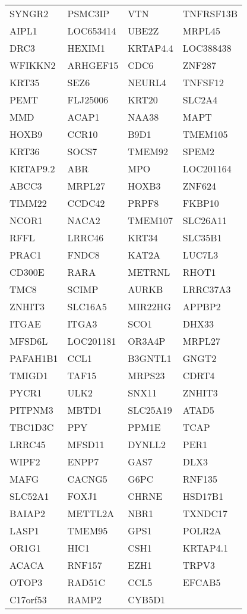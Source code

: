 {\begin{longtable}{llll}
SYNGR2&PSMC3IP&VTN&TNFRSF13B\tabularnewline
AIPL1&LOC653414&UBE2Z&MRPL45\tabularnewline
DRC3&HEXIM1&KRTAP4.4&LOC388438\tabularnewline
\newpage
WFIKKN2&ARHGEF15&CDC6&ZNF287\tabularnewline
KRT35&SEZ6&NEURL4&TNFSF12\tabularnewline
PEMT&FLJ25006&KRT20&SLC2A4\tabularnewline
MMD&ACAP1&NAA38&MAPT\tabularnewline
HOXB9&CCR10&B9D1&TMEM105\tabularnewline
KRT36&SOCS7&TMEM92&SPEM2\tabularnewline
KRTAP9.2&ABR&MPO&LOC201164\tabularnewline
ABCC3&MRPL27&HOXB3&ZNF624\tabularnewline
TIMM22&CCDC42&PRPF8&FKBP10\tabularnewline
NCOR1&NACA2&TMEM107&SLC26A11\tabularnewline
RFFL&LRRC46&KRT34&SLC35B1\tabularnewline
PRAC1&FNDC8&KAT2A&LUC7L3\tabularnewline
CD300E&RARA&METRNL&RHOT1\tabularnewline
TMC8&SCIMP&AURKB&LRRC37A3\tabularnewline
ZNHIT3&SLC16A5&MIR22HG&APPBP2\tabularnewline
ITGAE&ITGA3&SCO1&DHX33\tabularnewline
MFSD6L&LOC201181&OR3A4P&MRPL27\tabularnewline
PAFAH1B1&CCL1&B3GNTL1&GNGT2\tabularnewline
TMIGD1&TAF15&MRPS23&CDRT4\tabularnewline
PYCR1&ULK2&SNX11&ZNHIT3\tabularnewline
PITPNM3&MBTD1&SLC25A19&ATAD5\tabularnewline
TBC1D3C&PPY&PPM1E&TCAP\tabularnewline
LRRC45&MFSD11&DYNLL2&PER1\tabularnewline
WIPF2&ENPP7&GAS7&DLX3\tabularnewline
MAFG&CACNG5&G6PC&RNF135\tabularnewline
SLC52A1&FOXJ1&CHRNE&HSD17B1\tabularnewline
BAIAP2&METTL2A&NBR1&TXNDC17\tabularnewline
LASP1&TMEM95&GPS1&POLR2A\tabularnewline
OR1G1&HIC1&CSH1&KRTAP4.1\tabularnewline
ACACA&RNF157&EZH1&TRPV3\tabularnewline
OTOP3&RAD51C&CCL5&EFCAB5\tabularnewline
C17orf53&RAMP2&CYB5D1&\tabularnewline
\bottomrule
\end{longtable}}
\addtocounter{table}{-1}
